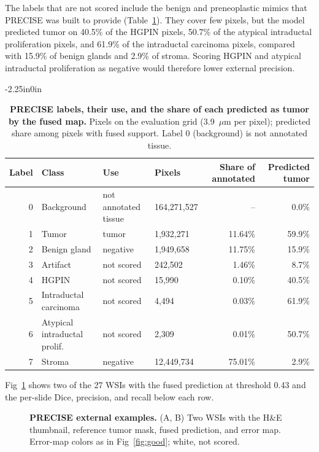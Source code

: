 \documentclass[10pt,letterpaper]{article}
\begin{document}
The labels that are not scored include the benign and preneoplastic mimics that PRECISE was built to provide (Table~\ref{tab:precise_labels}). They cover few pixels, but the model predicted tumor on 40.5\% of the HGPIN pixels, 50.7\% of the atypical intraductal proliferation pixels, and 61.9\% of the intraductal carcinoma pixels, compared with 15.9\% of benign glands and 2.9\% of stroma. Scoring HGPIN and atypical intraductal proliferation as negative would therefore lower external precision.

\begin{table}[H]\begin{adjustwidth}{-2.25in}{0in}\centering
\caption{\textbf{PRECISE labels, their use, and the share of each predicted as tumor by the fused map.} Pixels on the evaluation grid (3.9~$\mu$m per pixel); predicted share among pixels with fused support. Label 0 (background) is not annotated tissue.}
\begin{tabular}{rlllrr}\toprule Label & Class & Use & Pixels & Share of annotated & Predicted tumor\\\midrule
0 & Background & not annotated tissue & 164,271,527 & -- & 0.0\%\\
1 & Tumor & tumor & 1,932,271 & 11.64\% & 59.9\%\\
2 & Benign gland & negative & 1,949,658 & 11.75\% & 15.9\%\\
3 & Artifact & not scored & 242,502 & 1.46\% & 8.7\%\\
4 & HGPIN & not scored & 15,990 & 0.10\% & 40.5\%\\
5 & Intraductal carcinoma & not scored & 4,494 & 0.03\% & 61.9\%\\
6 & Atypical intraductal prolif. & not scored & 2,309 & 0.01\% & 50.7\%\\
7 & Stroma & negative & 12,449,734 & 75.01\% & 2.9\%\\
\bottomrule
\end{tabular}\label{tab:precise_labels}\end{adjustwidth}\end{table}

Fig~\ref{fig:precise} shows two of the 27 WSIs with the fused prediction at threshold 0.43 and the per-slide Dice, precision, and recall below each row.

\begin{figure}[H]
\centering
\caption{\textbf{PRECISE external examples.} (A, B) Two WSIs with the H\&E thumbnail, reference tumor mask, fused prediction, and error map. Error-map colors as in Fig~\ref{fig:good}; white, not scored.}
\label{fig:precise}
\end{figure}
\end{document}
